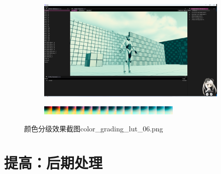 \documentclass{ctexart}
\begin{document}
    \begin{figure}[!htb]
        \centering
        \begin{subfigure}{1.0\textwidth}
            \includegraphics[width=\textwidth]{screen_shot_color_grading_map_color_grading_lut_06.png}
        \end{subfigure}
        \begin{subfigure}{1.0\textwidth}
            \includegraphics[width=\textwidth]{color_grading_lut_06.png}
        \end{subfigure}      
        \caption{颜色分级效果截图color\_grading\_lut\_06.png}
    \end{figure}  
    
    \section{提高：后期处理}
    
    
\end{document}
